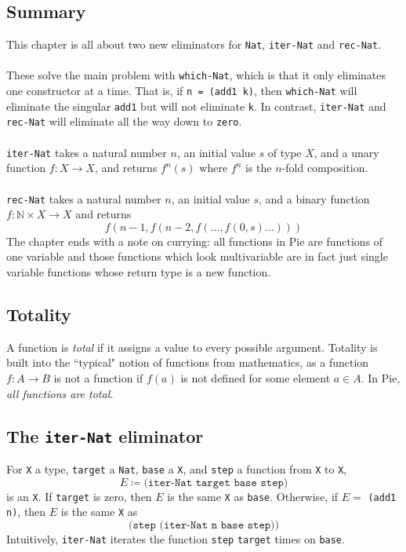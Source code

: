 \documentclass{article}
\newcommand{\ttt}[1]{\texttt{#1}}
\begin{document}
\subsection{Summary}
This chapter is all about two new eliminators for \ttt{Nat}, \ttt{iter-Nat} and \ttt{rec-Nat}.
\\ \\
These solve the main problem with \ttt{which-Nat}, which is that it only eliminates one constructor at a time. That is, if \ttt{n = (add1 k)}, then \ttt{which-Nat} will eliminate the singular \ttt{add1} but will not eliminate \ttt{k}. In contrast, \ttt{iter-Nat} and \ttt{rec-Nat} will eliminate all the way down to \ttt{zero}.
\\ \\
\ttt{iter-Nat} takes a natural number \(n\), an initial value \(s\) of type \(X\), and a unary function \(f : X \to X\), and returns \(f^n(s)\) where \(f^n\) is the \(n\)-fold composition.
\\ \\
\ttt{rec-Nat} takes a natural number \(n\), an initial value \(s\), and a binary function \(f : \mathbb{N} \times X \to X\) and returns \[
    f(n - 1, f(n-2, f(\dots, f(0, s)\dots)))
\]
The chapter ends with a note on currying: all functions in Pie are functions of one variable and those functions which look multivariable are in fact just single variable functions whose return type is a new function.
\subsection{Totality} 
A function is \textit{total} if it assigns a value to every possible argument. Totality is built into the ``typical" notion of functions from mathematics, as a function \(f : A \to B\) is not a function if \(f(a)\) is not defined for some element \(a \in A\). In Pie, \textit{all functions are total.}
\subsection{The \ttt{iter-Nat} eliminator}
For \ttt{X} a type, \ttt{target} a \ttt{Nat}, \ttt{base} a \ttt{X}, and \ttt{step} a function from \ttt{X} to \ttt{X}, \[ E \coloneqq \ttt{(iter-Nat target base step)} \] is an \ttt{X}. If \ttt{target} is zero, then \(E\) is the same \ttt{X} as \ttt{base}. Otherwise, if \(E = \) \ttt{(add1 n)}, then \(E\) is the same \ttt{X} as \[
    \ttt{(step (iter-Nat n base step))}
\]
Intuitively, \ttt{iter-Nat} iterates the function \ttt{step} \ttt{target} times on \ttt{base}.
\end{document}
